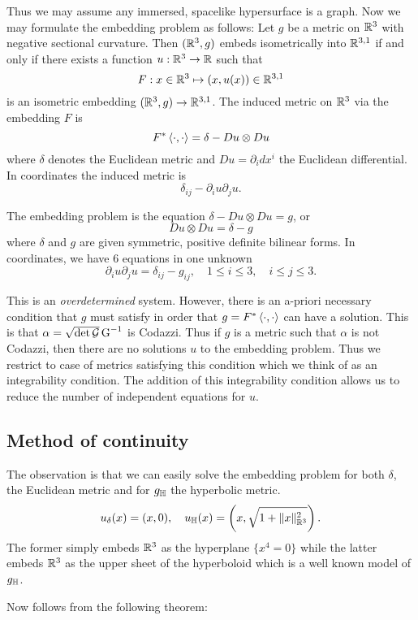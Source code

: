 \documentclass[a4paper, 12pt]{amsart}
\begin{document}
Thus we may assume any immersed, spacelike hypersurface is a graph. Now we may formulate the embedding problem as follows: Let \(g\) be a metric on \(\mathbb{R}^3\) with negative sectional curvature. Then \((\mathbb{R}^3, g)\) embeds isometrically into \(\mathbb{R}^{3,1}\) if and only if there exists a function \(u : \mathbb{R}^3 \to \mathbb{R}\) such that
\[
F : x \in \mathbb{R}^3 \mapsto (x, u(x)) \in \mathbb{R}^{3,1}
\]
is an isometric embedding \((\mathbb{R}^3, g) \to \mathbb{R}^{3,1}\). The induced metric on \(\mathbb{R}^3\) via the embedding \(F\) is
\[
F^{\ast} \left\langle \cdot,\cdot \right\rangle = \delta - Du \otimes Du
\]
where \(\delta\) denotes the Euclidean metric and \(Du = \partial_i dx^i\) the Euclidean differential. In coordinates the induced metric is
\[
\delta_{ij} - \partial_i u \partial_j u.
\]

The embedding problem is the equation \(\delta - Du \otimes Du = g\), or
\[
Du \otimes Du = \delta - g
\]
where \(\delta\) and \(g\) are given symmetric, positive definite bilinear forms. In coordinates, we have \(6\) equations in one unknown
\[
\partial_i u \partial_j u = \delta_{ij} - g_{ij}, \quad 1 \leq i \leq 3, \quad i \leq j \leq 3.
\]

This is an \emph{overdetermined} system. However, there is an a-priori necessary condition that \(g\) must satisfy in order that \(g = F^{\ast} \left\langle \cdot,\cdot \right\rangle\) can have a solution. This is that \(\alpha = \sqrt{\det \operatorname{\mathcal{G}}} \operatorname{G}^{-1}\) is Codazzi. Thus if \(g\) is a metric such that \(\alpha\) is not Codazzi, then there are no solutions \(u\) to the embedding problem. Thus we restrict to case of metrics satisfying this condition which we think of as an integrability condition. The addition of this integrability condition allows us to reduce the number of independent equations for \(u\).

\subsection{Method of continuity}
\label{subsec:embedding_continuity}

The observation is that we can easily solve the embedding problem for both \(\delta\), the Euclidean metric and for \(g_{\mathbb{H}}\) the hyperbolic metric.
\[
u_{\delta} (x) = (x, 0), \quad u_{\mathbb{H}} (x) = \left(x, \sqrt{1 + \|x\|_{\mathbb{R}^3}^2}\right).
\]
The former simply embeds \(\mathbb{R}^3\) as the hyperplane \(\{x^4 = 0\}\) while the latter embeds \(\mathbb{R}^3\) as the upper sheet of the hyperboloid which is a well known model of \(g_{\mathbb{H}}\).

Now  follows from the following theorem:
\end{document}
